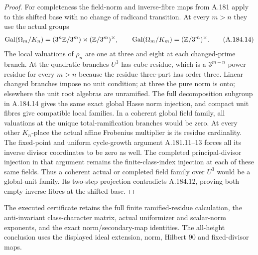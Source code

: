 \begin{proof}
For completeness the field-norm and inverse-fibre maps from
A.181 apply to this shifted base with no change of radicand
transition.  At every \(m>n\) they use the actual groups
\[
 \operatorname{Gal}(\Omega_m/K_n)
      =(3^n\mathbb Z/3^m)\rtimes(\mathbb Z/3^m)^\times,
 \qquad\operatorname{Gal}(\Omega_m/K_m)
      =(\mathbb Z/3^m)^\times.
\tag{A.184.14}
\]
The local valuations of \(\rho_n\) are one at three
and eight at each changed-prime branch.  At the quadratic
branches \(U^3\) has cube residue, which is a
\(3^{m-n}\)-power residue for every \(m>n\) because
the residue three-part has order three.  Linear changed
branches impose no unit condition; at three the pure norm
is onto; elsewhere the unit root algebras are unramified.
The full decomposition subgroup in A.184.14 gives the
same exact global Hasse norm injection, and compact unit
fibres give compatible local families.
In a coherent global field family, all valuations at the
unique total-ramification branches would be zero.  At every
other \(K_n\)-place the actual affine Frobenius multiplier
is its residue cardinality.  The fixed-point and uniform
cycle-growth argument A.181.11--13 forces all its inverse
divisor coordinates to be zero as well.  The completed
principal-divisor injection in that argument remains the
finite-class-index injection at each of these same fields.
Thus a coherent actual or completed field family over
\(U^3\) would be a global-unit family.  Its two-step
projection contradicts A.184.12, proving both empty inverse
fibres at the shifted base.
\end{proof}

The executed certificate
retains the full finite ramified-residue calculation, the
anti-invariant class-character matrix, actual uniformizer
and scalar-norm exponents, and the exact norm/secondary-map
identities.  The all-height conclusion uses the displayed
ideal extension, norm, Hilbert 90 and fixed-divisor maps.
